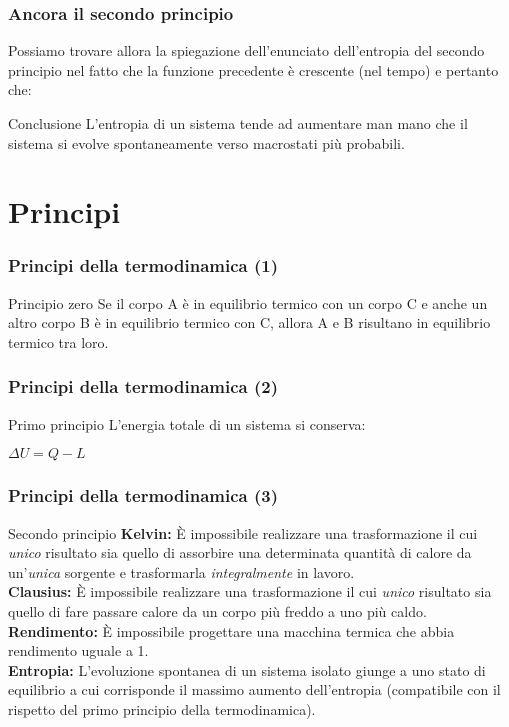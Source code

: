 \documentclass[]{beamer}
\theoremstyle{plain}
\begin{document}
\begin{frame}
\frametitle{Ancora il secondo principio}
  Possiamo trovare allora la spiegazione dell'enunciato dell'entropia del secondo principio nel fatto che la funzione precedente è crescente (nel tempo) e pertanto che:
\begin{block}{Conclusione}
  L'entropia di un sistema tende ad aumentare man mano che il sistema si evolve spontaneamente verso macrostati più probabili.
\end{block}
\end{frame}


\section{Principi}

\begin{frame}
  \frametitle{Principi della termodinamica (1)}
  \begin{block}{Principio zero}
    Se il corpo A è in equilibrio termico con un corpo C e anche un altro corpo B è in equilibrio termico con C, allora A e B risultano in equilibrio termico tra loro.
  \end{block}
\end{frame}

\begin{frame}
  \frametitle{Principi della termodinamica (2)}
  \begin{block}{Primo principio}
    L'energia totale di un sistema si conserva: 
    \begin{center}
\colorbox{blue!30}{$ \Delta U = Q - L $}
\end{center}
  \end{block}
\end{frame}


\begin{frame}
  \frametitle{Principi della termodinamica (3)}
  \begin{block}{Secondo principio}
    \textbf{Kelvin:} È impossibile realizzare una trasformazione il cui \emph{unico} risultato sia quello di assorbire una determinata quantità di calore da un’\emph{unica} sorgente e trasformarla \emph{integralmente} in lavoro.\\
    \textbf{Clausius:} È impossibile realizzare una trasformazione il cui \emph{unico} risultato sia quello di fare passare calore da un corpo più freddo a uno più caldo.\\
    \textbf{Rendimento:} È impossibile progettare una macchina termica che abbia rendimento uguale a 1.\\
    \textbf{Entropia:} L'evoluzione spontanea di un sistema isolato giunge a uno stato di equilibrio a cui corrisponde il massimo aumento dell’entropia (compatibile con il rispetto del primo principio della termodinamica).
  \end{block}
\end{frame}
\end{document}
